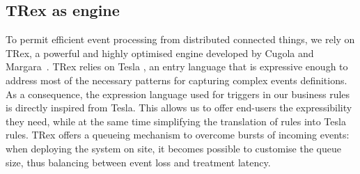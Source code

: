 \subsection{TRex as \CEP engine}
\label{sec:CG-TRex}

To permit efficient event processing from distributed connected things, we rely on TRex, a powerful and highly optimised \CEP engine developed by Cugola and Margara~\cite{cugola-12}. TRex relies on Tesla \cite{Cugola-Margara:2010}, an entry language that is expressive enough to address most of the necessary patterns for capturing complex events definitions. As a consequence, the expression language used for triggers in our business rules is directly inspired from Tesla. This allows us to offer end-users the expressibility they need, while at the same time simplifying the translation of \IOTDSL rules into Tesla rules. TRex offers a queueing mechanism to overcome bursts of incoming events: when deploying the \IOT system on site, it becomes possible to customise the queue size, thus balancing between event loss and treatment latency. 

